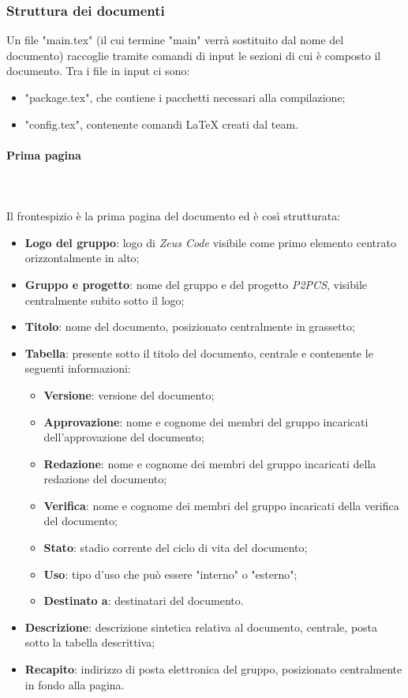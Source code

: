 	\subsubsection{Struttura dei documenti}
	Un file "main.tex" (il cui termine "main" verrà sostituito dal nome del documento) raccoglie tramite comandi di input le sezioni di cui è composto il documento. Tra i file in input ci sono:
	\begin{itemize}
		\item "package.tex", che contiene i pacchetti necessari alla compilazione;
		\item "config.tex", contenente comandi \LaTeX{} creati dal team.
	\end{itemize}
		\paragraph{Prima pagina} \mbox{}\\ \mbox{}\\
		Il frontespizio è la prima pagina del documento ed è così strutturata:
		\begin{itemize}
			\item \textbf{Logo del gruppo}: logo di \textit{Zeus Code} visibile come primo elemento centrato orizzontalmente in alto;
			\item \textbf{Gruppo e progetto}: nome del gruppo e del progetto \textit{P2PCS}, visibile centralmente subito sotto il logo;
			\item \textbf{Titolo}: nome del documento, posizionato centralmente in grassetto;
			\item \textbf{Tabella}: presente sotto il titolo del documento, centrale e contenente le seguenti informazioni:
			\begin{itemize}
				\item \textbf{Versione}: versione del documento;
				\item \textbf{Approvazione}: nome e cognome dei membri del gruppo incaricati dell'approvazione del documento;
				\item \textbf{Redazione}: nome e cognome dei membri del gruppo incaricati della redazione del documento;
				\item \textbf{Verifica}: nome e cognome dei membri del gruppo incaricati della verifica del documento;
				\item \textbf{Stato}: stadio corrente del ciclo di vita del documento;
				\item \textbf{Uso}: tipo d'uso che può essere "interno" o "esterno";
				\item \textbf{Destinato a}: destinatari del documento.
			\end{itemize}
			\item \textbf{Descrizione}: descrizione sintetica relativa al documento, centrale, posta sotto la tabella descrittiva;
			\item \textbf{Recapito}: indirizzo di posta elettronica del gruppo, posizionato centralmente in fondo alla pagina.
		\end{itemize}
